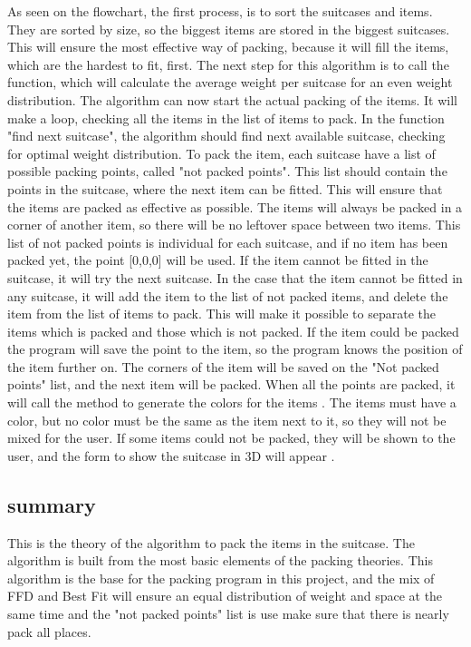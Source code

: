 As seen on the flowchart, the first process, is to sort the suitcases and items. They are sorted by size, so the biggest items are stored in the biggest suitcases. This will ensure the most effective way of packing, because it will fill the items, which are the hardest to fit, first. The next step for this algorithm is to call the function, which will calculate the average weight per suitcase for an even weight distribution. The algorithm can now start the actual packing of the items.
It will make a loop, checking all the items in the list of items to pack. In the function "find next suitcase", the algorithm should find next available suitcase, checking for optimal weight distribution. To pack the item, each suitcase have a list of possible packing points, called "not packed points". This list should contain the points in the suitcase, where the next item can be fitted. This will ensure that the items are packed as effective as possible. The items will always be packed in a corner of another item, so there will be no leftover space between two items. This list of not packed points is individual for each suitcase, and if no item has been packed yet, the point [0,0,0] will be used. If the item cannot be fitted in the suitcase, it will try the next suitcase. In the case that the item cannot be fitted in any suitcase, it will add the item to the list of not packed items, and delete the item from the list of items to pack. This will make it possible to separate the items which is packed and those which is not packed. If the item could be packed the program will save the point to the item, so the program knows the position of the item further on. The corners of the item will be saved on the "Not packed points" list, and the next item will be packed.
When all the points are packed, it will call the method to generate the colors for the items . The items must have a color, but no color must be the same as the item next to it, so they will not be mixed for the user. If some items could not be packed, they will be shown to the user, and the form to show the suitcase in 3D will appear .

\subsection{summary}
This is the theory of the algorithm to pack the items in the suitcase. The algorithm is built from the most basic elements of the packing theories. This algorithm is the base for the packing program in this project, and the mix of FFD and Best Fit will ensure an equal distribution of weight and space at the same time and the "not packed points" list is use make sure that there is nearly pack all places.